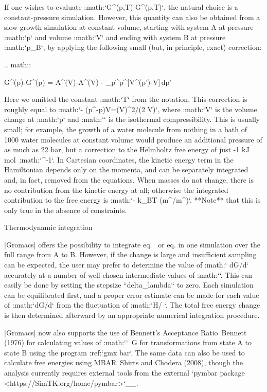 If one wishes to evaluate
:math:`G{^{}}(p,T)-G{^{}}(p,T)`, the natural choice
is a constant-pressure simulation. However, this quantity can also be
obtained from a slow-growth simulation at constant volume, starting with
system A at pressure :math:`p` and volume :math:`V` and ending with
system B at pressure :math:`p_B`, by applying the following small (but,
in principle, exact) correction:

.. math::

   G{^{}}(p)-G{^{}}(p) =
   A{^{}}(V)-A{^{}}(V) - \int_p^{p{^{}}}[V{^{}}(p')-V]\,dp'

Here we omitted the constant :math:`T` from the notation. This
correction is roughly equal to
:math:`- (p{^{}}-p)\Delta V=(\Delta V)^2/(2
\kappa V)`, where :math:`\Delta V` is the volume change at :math:`p` and
:math:`\kappa` is the isothermal compressibility. This is usually small;
for example, the growth of a water molecule from nothing in a bath of
1000 water molecules at constant volume would produce an additional
pressure of as much as 22 bar, but a correction to the Helmholtz free
energy of just -1 kJ mol\ :math:`^{-1}`. In Cartesian coordinates, the
kinetic energy term in the Hamiltonian depends only on the momenta, and
can be separately integrated and, in fact, removed from the equations.
When masses do not change, there is no contribution from the kinetic
energy at all; otherwise the integrated contribution to the free energy
is :math:`- k_BT \ln
(m{^{}}/m{^{}})`. **Note** that this is only true in
the absence of constraints.

Thermodynamic integration
~~~~~~~~~~~~~~~~~~~~~~~~~

|Gromacs| offers the possibility to integrate
eq. 
or eq. 
in one
simulation over the full range from A to B. However, if the change is
large and insufficient sampling can be expected, the user may prefer to
determine the value of :math:`\langle
dG/d\lambda \rangle` accurately at a number of well-chosen intermediate
values of :math:`\lambda`. This can easily be done by setting the
stepsize ``delta_lambda`` to zero. Each simulation can be
equilibrated first, and a proper error estimate can be made for each
value of :math:`dG/d\lambda` from the fluctuation of
:math:`\partial H/\partial
\lambda`. The total free energy change is then determined afterward by
an appropriate numerical integration procedure.

|Gromacs| now also supports the use of Bennett’s Acceptance Ratio Bennett
(1976) for calculating values of :math:`\Delta`\ G for transformations
from state A to state B using the program :ref:`gmx bar`. The same data can also be used to
calculate free energies using MBAR Shirts and Chodera (2008), though the
analysis currently requires external tools from the external
`pymbar package <https://SimTK.org/home/pymbar>`__.

